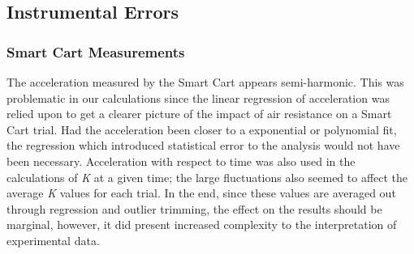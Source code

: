 \documentclass[
    letterpaper,
    man,
    floatsintext,
    british
]{apa6}
\begin{document}
\subsection{Instrumental Errors}
\subsubsection{Smart Cart Measurements}
The acceleration measured by the Smart Cart appears semi-harmonic. This was problematic in our calculations since
the linear regression of acceleration was relied upon to get a clearer picture of the impact of air resistance on
a Smart Cart trial. Had the acceleration been closer to a exponential or polynomial fit, the regression which introduced
statistical error to the analysis would not have been necessary. Acceleration with respect to time was also used in the calculations of \textit{K} at a given time;
the large fluctuations also seemed to affect the average \textit{K} values for each trial. In the end, since these values
are averaged out through regression and outlier trimming, the effect on the results should be marginal, however, it did
present increased complexity to the interpretation of experimental data.



\end{document}
